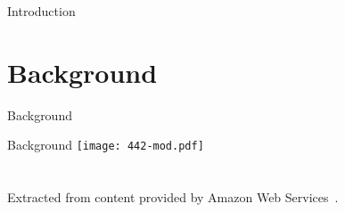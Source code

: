 \documentclass[t,handout]{beamer}   %
\begin{document}
\begin{frame}{Introduction}
\end{frame}

\section{Background}

\begin{frame}{Background}
\end{frame}

\begin{frame}{Background}
 	\texttt{[image: 442-mod.pdf]} \\~\\~\\
 	{\tiny Extracted from content provided by Amazon Web Services~\cite{Aws:15}.}
\end{frame}
\end{document}
